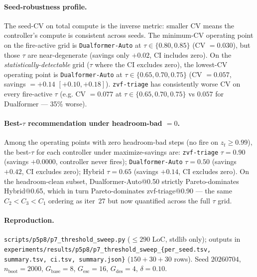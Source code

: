 \documentclass{article}
\begin{document}
\paragraph{Seed-robustness profile.}
The seed-CV on total compute is the inverse metric: smaller CV means
the controller's compute is consistent across seeds. The minimum-CV
operating point on the fire-active grid is \texttt{Dualformer-Auto}
at $\tau \in \{0.80, 0.85\}$ (CV $= 0.030$), but those $\tau$ are
near-degenerate (savings only $+0.02$, CI includes zero). On the
\emph{statistically-detectable} grid ($\tau$ where the CI excludes
zero), the lowest-CV operating point is
\texttt{Dualformer-Auto} at $\tau \in \{0.65, 0.70, 0.75\}$
(CV $= 0.057$, savings $= +0.14$ $[+0.10, +0.18]$). \texttt{zvf-triage}
has consistently worse CV on every fire-active $\tau$ (e.g. CV $= 0.077$
at $\tau \in \{0.65, 0.70, 0.75\}$ vs $0.057$ for Dualformer — 35\%
worse).

\paragraph{Best-$\tau$ recommendation under headroom-bad $= 0$.}
Among the operating points with zero headroom-bad steps (no fire on
$z_t \geq 0.99$), the best-$\tau$ for each controller under
maximize-savings are: \texttt{zvf-triage} $\tau{=}0.90$ (savings
$+0.0000$, controller never fires); \texttt{Dualformer-Auto}
$\tau{=}0.50$ (savings $+0.42$, CI excludes zero); Hybrid $\tau{=}0.65$
(savings $+0.14$, CI excludes zero). On the headroom-clean subset,
Dualformer-Auto@0.50 strictly Pareto-dominates Hybrid@0.65, which in
turn Pareto-dominates zvf-triage@0.90 — the same $C_2 < C_3 < C_1$
ordering as iter~27 but now quantified across the full $\tau$ grid.

\paragraph{Reproduction.}
\texttt{scripts/p5p8/p7\_threshold\_sweep.py} ($\leq 290$ LoC,
stdlib only); outputs in
\texttt{experiments/results/p5p8/p7\_threshold\_sweep\_\{per\_seed.tsv,
summary.tsv, ci.tsv, summary.json\}} ($150 + 30 + 30$ rows). Seed
$20260704$, $n_{\mathrm{boot}}{=}2000$, $G_{\mathrm{base}}{=}8$,
$G_{\mathrm{esc}}{=}16$, $G_{\mathrm{des}}{=}4$, $\delta{=}0.10$.
\end{document}
